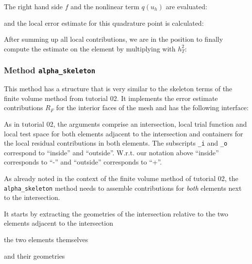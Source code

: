 \documentclass[a4paper,12pt]{article}
\begin{document}
The right hand side $f$ and the nonlinear term $q(u_h)$ are evaluated:

and the local error estimate for this quadrature point is calculated:


After summing up all local contributions, we are in the position to finally
compute the estimate on the element by multiplying with $h_T^2$:


\subsubsection*{Method \lstinline{alpha_skeleton}}

This method has a structure that is very similar to the skeleton terms of
the finite volume method from tutorial 02. It implements the error
estimate contributions $R_F$ for the interior faces of the mesh and has the
following interface:

As in tutorial 02, the arguments comprise an intersection, local trial function
and local test space for both elements adjacent to the intersection
and containers for the local residual contributions in both elements.
The subscripts \lstinline{_i} and \lstinline{_o} correspond to
``inside'' and ``outside''. W.r.t. our notation above ``inside'' corresponds to
``-'' and ``outside'' corresponds to ``+''.

As already noted in the context of the finite volume method of tutorial 02,
the \lstinline{alpha_skeleton} method needs to assemble contributions for
\textit{both} elements next to the intersection.

It starts by extracting the geometries of the intersection relative to the
two elements adjacent to the intersection

the two elements themselves

and their geometries

\end{document}
